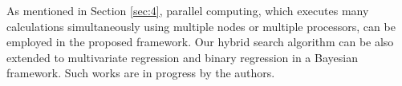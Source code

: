 \documentclass[twocolumn]{svjour3}       %
\newcommand{\0}{\boldsymbol 0} %
\newcommand{\1}{\boldsymbol 1} %
\begin{document}
{As mentioned in Section \ref{sec:4}, parallel computing, which executes many calculations simultaneously using multiple nodes or multiple processors, can be employed in the proposed framework. Our hybrid search algorithm can be also extended to multivariate regression and binary regression in a Bayesian framework. Such works are in progress by the authors.




%
%


 


\appendix
}
\end{document}
